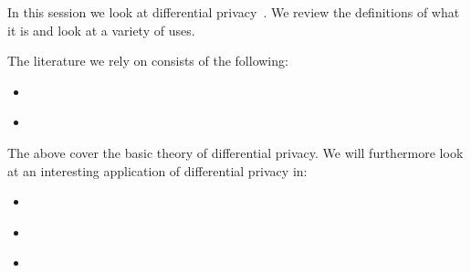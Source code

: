In this session we look at differential privacy~\cite{DifferentialPrivacy}.
We review the definitions of what it is and look at a variety of uses.

The literature we rely on consists of the following:
\begin{itemize}
\item {}~\cite{DifferentialPrivacy}
\item {}~\cite{DiffPrivSurvey}
\end{itemize}
The above cover the basic theory of differential privacy.
We will furthermore look at an interesting application of differential privacy 
in:
\begin{itemize}
\item {}~\cite{ChallengingDiffPriv}
\item {}~\cite{BLIP-1}
\item {}~\cite{BLIP-2}
\end{itemize}
